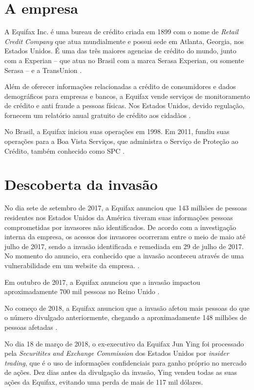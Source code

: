 \documentclass[conference]{IEEEtran}
\begin{document}
\section{A empresa}
A Equifax Inc. é uma bureau de crédito criada em 1899 com o nome de \textit{Retail Credit Company} que atua mundialmente e possui sede em Atlanta, Georgia, nos Estados Unidos. 
É uma das três maiores agencias de crédito do mundo, junto com a Experian -- que atua no Brasil com a marca Serasa Experian,
ou somente Serasa -- e a TransUnion \cite{Roos2008}.

Além de oferecer informações relacionadas a crédito de consumidores e dados demográficos para empresas e bancos, a Equifax
vende serviços de monitoramento de crédito e anti fraude a pessoas físicas. Nos Estados Unidos, devido regulação, fornecem um
relatório anual gratuito de crédito aos cidadãos \cite{Roos2008} \cite{Garkinkel1995}. 

No Brasil, a Equifax iniciou suas operações em 1998. Em 2011, fundiu suas operações para a Boa Vista Serviços, que administra o Serviço de Proteção ao Crédito, também conhecido
como SPC \cite{BoaVista2018} \cite{Sandrini2011}. 

\section{Descoberta da invasão} 
No dia sete de setembro de 2017, a Equifax anunciou que 143 milhões de pessoas residentes nos Estados Unidos da América tiveram suas informações pessoas comprometidas por invasores 
não identificados. De acordo com a investigação interna da empresa, os acessos dos invasores ocorreram entre o meio de maio até julho de 2017, sendo a invasão identificada e remediada 
em 29 de julho de 2017. No momento do anuncio, era conhecido que a invasão aconteceu através de uma vulnerabilidade em um website da empresa. \cite{Carman2017} \cite{Equifax2017} \cite{Bernard2017} \cite{Moore2017}.

Em outubro de 2017, a Equifax anunciou que a invasão impactou aproximadamente 700 mil pessoas no Reino Unido \cite{Pritchard2017}. 

No começo de 2018, a Equifax anunciou que a invasão afetou mais pessoas do que o número divulgado anteriormente, chegando a aproximadamente 148 milhões de pessoas afetadas \cite{Whittaker2018} \cite{Borak2018} \cite{Clements2018}.

No dia 18 de março de 2018, o ex-executivo da Equifax Jun Ying foi processado pela \textit{Securitites and Exchange Commission} dos Estados Unidos por \textit{insider trading}, que é o uso de informações confidenciais
para ganho próprio no mercado de ações. Dez dias antes da divulgação da invasão, Ying vendeu todas as suas ações da Equifax, evitando uma perda de mais de 117 mil dólares. 
\end{document}
